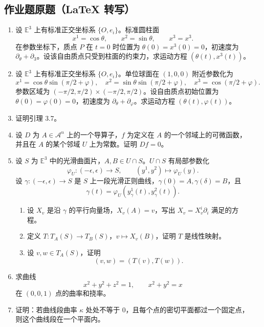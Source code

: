 \documentclass[UTF8,12pt,a4paper]{ctexart}
\newcommand{\E}{\mathbb E}
\newcommand{\A}{\mathcal A}
\begin{document}
\subsection{作业题原题（LaTeX 转写）}
\begin{enumerate}
\item 设 $\E^3$ 上有标准正交坐标系 $\{O,e_i\}$。标准圆柱面
\[
x^1=\cos\theta,\qquad x^2=\sin\theta,\qquad x^3=x^3.
\]
在参数坐标下，质点 $P$ 在 $t=0$ 时位置为 $\theta(0)=x^3(0)=0$，初速度为 $\partial_\theta+\partial_3$。设该自由质点只受到柱面的约束力，求运动方程 $(\theta(t),x^3(t))$。

\item 设 $\E^3$ 上有标准正交坐标系 $\{O,e_i\}$。单位球面在 $(1,0,0)$ 附近参数化为
\[
x^1=\cos\theta\sin(\pi/2+\varphi),\quad
x^2=\sin\theta\sin(\pi/2+\varphi),\quad
x^3=\cos(\pi/2+\varphi).
\]
参数区域为 $(-\pi/2,\pi/2)\times(-\pi/2,\pi/2)$。设自由质点初始位置为 $\theta(0)=\varphi(0)=0$，初速度为 $\partial_\theta+\partial_\varphi$。求运动方程 $(\theta(t),\varphi(t))$。

\item 证明引理 3.7。

\item 设 $D$ 为 $A\in\A^n$ 上的一个导算子，$f$ 为定义在 $A$ 的一个邻域上的可微函数，并且在 $A$ 的某个邻域 $U$ 上为常数。证明 $Df=0$。

\item 设 $S$ 为 $\E^3$ 中的光滑曲面片，$A,B\in U\cap S$。$U\cap S$ 有局部参数化
\[
\varphi_U:(-\epsilon,\epsilon)\to S,\qquad (y^1,y^2)\mapsto\varphi_U(y).
\]
设 $\gamma:(-\epsilon,\epsilon)\to S$ 是 $S$ 上一段光滑正则曲线，$\gamma(0)=A,\gamma(\delta)=B$，且
\[
\gamma(t)=\varphi_U(y_\gamma^1(t),y_\gamma^2(t)).
\]
\begin{enumerate}
\item 设 $X_v$ 是沿 $\gamma$ 的平行向量场，$X_v(A)=v$，写出 $X_v=X_v^i\partial_i$ 满足的方程。
\item 定义 $T:T_A(S)\to T_B(S)$，$v\mapsto X_v(B)$，证明 $T$ 是线性映射。
\item 设 $v,w\in T_A(S)$，证明
\[
(v,w)=(T(v),T(w)).
\]
\end{enumerate}

\item 求曲线
\[
x^2+y^2+z^2=1,\qquad x^2+y^2=x
\]
在 $(0,0,1)$ 点的曲率和挠率。

\item 证明：若曲线段曲率 $\kappa$ 处处不等于 $0$，且每个点的密切平面都过一个固定点，则这个曲线段在一个平面内。


\end{enumerate}
\end{document}
